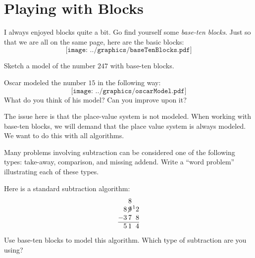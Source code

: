 \newpage
\section{Playing with Blocks}\label{A:B1}

I always enjoyed blocks quite a bit. Go find yourself
some \textit{base-ten blocks}. Just so that we are all on the same
page, here are the basic blocks:
\[
\texttt{[image: ../graphics/baseTenBlocks.pdf]}
\]

\begin{prob} 
Sketch a model of the number $247$ with base-ten blocks.
\vspace{0.8in}
\end{prob}

\begin{prob}
Oscar modeled the number $15$ in the following way:
\[
\texttt{[image: ../graphics/oscarModel.pdf]}
\]
What do you think of his model?  Can you improve upon it?  
\vspace{0.5in}
\end{prob}

\begin{teachingnote}
The issue here is that the place-value system is not modeled. When
working with base-ten blocks, we will demand that the place value
system is always modeled.  We want to do this with all algorithms.  
\end{teachingnote}

\begin{prob}
Many problems involving subtraction can be considered one of the following types:  take-away, comparison, and missing addend.  Write a ``word problem'' illustrating each of these types.  
\end{prob}

\newpage

\begin{prob} 
Here is a standard subtraction algorithm:
\[
\begin{tabular}{@{}r@{}r@{}r@{}r@{}}
&   & 8 &  \\
& 8 & $\not{\hspace{-.2ex}9}$ & $\hspace{.3ex}\leftexp{1}2$\\
$-$ & 3 & 7 & 8\\ \hline
& 5 & 1 & 4
\end{tabular}
\]
Use base-ten blocks to model this algorithm.  Which type of subtraction are you using?  
\end{prob}

